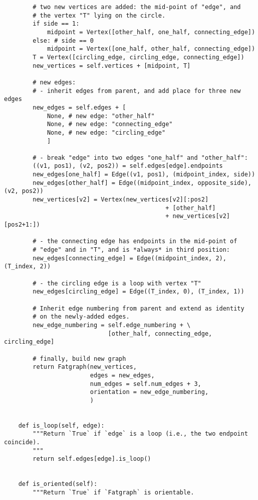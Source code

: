 \begin{lstlisting}
        # two new vertices are added: the mid-point of "edge", and
        # the vertex "T" lying on the circle.
        if side == 1:
            midpoint = Vertex([other_half, one_half, connecting_edge])
        else: # side == 0
            midpoint = Vertex([one_half, other_half, connecting_edge])
        T = Vertex([circling_edge, circling_edge, connecting_edge])
        new_vertices = self.vertices + [midpoint, T]

        # new edges:
        # - inherit edges from parent, and add place for three new edges
        new_edges = self.edges + [
            None, # new edge: "other_half"
            None, # new edge: "connecting_edge"
            None, # new edge: "circling_edge"
            ]
        
        # - break "edge" into two edges "one_half" and "other_half":
        ((v1, pos1), (v2, pos2)) = self.edges[edge].endpoints
        new_edges[one_half] = Edge((v1, pos1), (midpoint_index, side))
        new_edges[other_half] = Edge((midpoint_index, opposite_side), (v2, pos2))
        new_vertices[v2] = Vertex(new_vertices[v2][:pos2]
                                             + [other_half]
                                             + new_vertices[v2][pos2+1:])

        # - the connecting edge has endpoints in the mid-point of
        # "edge" and in "T", and is *always* in third position:
        new_edges[connecting_edge] = Edge((midpoint_index, 2), (T_index, 2))

        # - the circling edge is a loop with vertex "T"
        new_edges[circling_edge] = Edge((T_index, 0), (T_index, 1))

        # Inherit edge numbering from parent and extend as identity
        # on the newly-added edges.
        new_edge_numbering = self.edge_numbering + \
                             [other_half, connecting_edge, circling_edge]

        # finally, build new graph 
        return Fatgraph(new_vertices,
                        edges = new_edges,
                        num_edges = self.num_edges + 3,
                        orientation = new_edge_numbering,
                        )
    

    def is_loop(self, edge):
        """Return `True` if `edge` is a loop (i.e., the two endpoint coincide).
        """
        return self.edges[edge].is_loop()
        

    def is_oriented(self):
        """Return `True` if `Fatgraph` is orientable.


\end{lstlisting}
